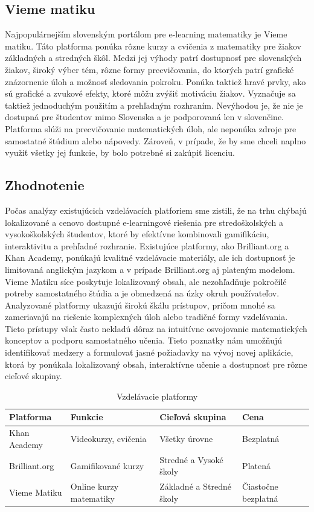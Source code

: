 \subsection{Vieme matiku}
Najpopulárnejším slovenským portálom pre e-learning matematiky je Vieme matiku.
Táto platforma ponúka rôzne kurzy a cvičenia z matematiky pre žiakov základných a stredných škôl.
Medzi jej výhody patrí dostupnosť pre slovenských žiakov, široký výber tém, rôzne formy precvičovania,
do ktorých patrí grafické znázornenie úloh a možnosť sledovania pokroku.
Ponúka taktiež hravé prvky, ako sú grafické a zvukové efekty, ktoré môžu zvýšiť motiváciu žiakov.
Vyznačuje sa taktiež jednoduchým použitím a prehľadným rozhraním.
Nevýhodou je, že nie je dostupná pre študentov mimo Slovenska a je podporovaná len v slovenčine.
Platforma slúži na precvičovanie matematických úloh, ale neponúka zdroje pre samostatné štúdium alebo nápovedy. 
Zároveň, v prípade, že by sme chceli naplno využiť všetky jej funkcie, by bolo potrebné si zakúpiť licenciu. \cite{viemeto}
\subsection{Zhodnotenie}
Počas analýzy existujúcich vzdelávacích platforiem sme zistili, že na trhu chýbajú lokalizované a cenovo dostupné e-learningové riešenia pre stredoškolských a vysokoškolských študentov, ktoré by efektívne kombinovali gamifikáciu, interaktivitu a prehľadné rozhranie. 
Existujúce platformy, ako Brilliant.org a Khan Academy, ponúkajú kvalitné vzdelávacie materiály, ale ich dostupnosť je limitovaná anglickým jazykom a v prípade Brilliant.org aj plateným modelom. 
Vieme Matiku síce poskytuje lokalizovaný obsah, ale nezohľadňuje pokročilé potreby samostatného štúdia a je obmedzená na úzky okruh používateľov.
Analyzované platformy ukazujú širokú škálu prístupov, pričom mnohé sa zameriavajú na riešenie komplexných úloh alebo tradičné formy vzdelávania.
 Tieto prístupy však často nekladú dôraz na intuitívne osvojovanie matematických konceptov a podporu samostatného učenia. 
Tieto poznatky nám umožňujú identifikovať medzery a formulovať jasné požiadavky na vývoj novej aplikácie, ktorá by ponúkala lokalizovaný obsah, interaktívne učenie a dostupnosť pre rôzne cieľové skupiny.
\begin{table}[htbp]
\caption{Vzdelávacie platformy}
\label{vzdelavaciePlatformy}
\begin{tabularx}{\textwidth}{|X|X|X|X|}
\hline
\textbf{Platforma} & \textbf{Funkcie} & \textbf{Cieľová skupina} & \textbf{Cena} \\ \hline
Khan Academy & Videokurzy, cvičenia & Všetky úrovne & Bezplatná \\ \hline
Brilliant.org & Gamifikované kurzy & Stredné a Vysoké školy & Platená \\ \hline
Vieme Matiku & Online kurzy matematiky & Základné a Stredné školy & Čiastočne bezplatná \\ \hline
\end{tabularx}
\end{table}

